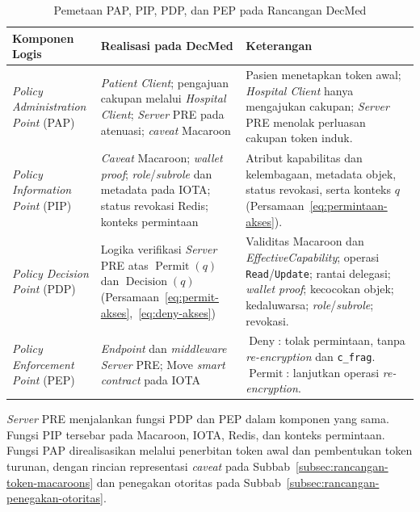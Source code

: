 \begin{table}[H]
	\centering
	\caption{Pemetaan PAP, PIP, PDP, dan PEP pada Rancangan DecMed}
	\label{tab:pemetaan-pap-pip-pdp-pep-decmed}
	\small
	\begin{tabularx}{\textwidth}{%
		|>{\raggedright\arraybackslash}p{}%
		|>{\raggedright\arraybackslash}X%
		|>{\raggedright\arraybackslash}X|}
		\hline
		\textbf{Komponen Logis}
		 & \textbf{Realisasi pada DecMed}
		 & \textbf{Keterangan}                                                                                                                                                                                         \\ \hline

		\textit{Policy Administration Point} (PAP)
		 & \textit{Patient Client}; pengajuan cakupan melalui \textit{Hospital Client}; \textit{Server} PRE pada atenuasi; \textit{caveat} Macaroon
		 & Pasien menetapkan token awal; \textit{Hospital Client} hanya mengajukan cakupan; \textit{Server} PRE menolak perluasan cakupan token induk.                                                                 \\ \hline

		\textit{Policy Information Point} (PIP)
		 & \textit{Caveat} Macaroon; \textit{wallet proof}; \textit{role}/\textit{subrole} dan metadata pada IOTA; status revokasi Redis; konteks permintaan
		 & Atribut kapabilitas dan kelembagaan, metadata objek, status revokasi, serta konteks $q$ (Persamaan~\ref{eq:permintaan-akses}).                                                                              \\ \hline

		\textit{Policy Decision Point} (PDP)
		 & Logika verifikasi \textit{Server} PRE atas $\operatorname{Permit}(q)$ dan $\operatorname{Decision}(q)$ (Persamaan~\ref{eq:permit-akses},~\ref{eq:deny-akses})
		 & Validitas Macaroon dan \textit{EffectiveCapability}; operasi \texttt{Read}/\texttt{Update}; rantai delegasi; \textit{wallet proof}; kecocokan objek; kedaluwarsa; \textit{role}/\textit{subrole}; revokasi. \\ \hline

		\textit{Policy Enforcement Point} (PEP)
		 & \textit{Endpoint} dan \textit{middleware} \textit{Server} PRE; Move \textit{smart contract} pada IOTA
		 & $\operatorname{Deny}$: tolak permintaan, tanpa \textit{re-encryption} dan \texttt{c\_frag}. $\operatorname{Permit}$: lanjutkan operasi \textit{re-encryption}.                                              \\ \hline
	\end{tabularx}
\end{table}

\textit{Server} PRE menjalankan fungsi PDP dan PEP dalam komponen yang sama. Fungsi PIP tersebar pada Macaroon, IOTA, Redis, dan konteks permintaan. Fungsi PAP direalisasikan melalui penerbitan token awal dan pembentukan token turunan, dengan rincian representasi \textit{caveat} pada Subbab~\ref{subsec:rancangan-token-macaroons} dan penegakan otoritas pada Subbab~\ref{subsec:rancangan-penegakan-otoritas}.
